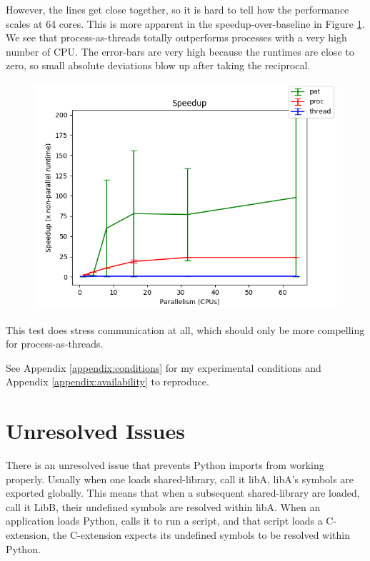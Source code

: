 \documentclass[letterpaper,twocolumn,10pt]{article}
\begin{document}
However, the lines get close together, so it is hard to tell how the performance scales at 64 cores.
This is more apparent in the speedup-over-baseline in Figure \ref{fig:count_speedup}.
We see that process-as-threads totally outperforms processes with a very high number of CPU.
The error-bars are very high because the runtimes are close to zero, so small absolute deviations blow up after taking the reciprocal.

\begin{figure}
\begin{center}
\includegraphics[width=\textwidth / 2]{total_speedup.png}
\end{center}
\caption{\label{fig:count_speedup} }
\end{figure}

This test does stress communication at all, which should only be more compelling for process-as-threads.

See Appendix \ref{appendix:conditions} for my experimental conditions and Appendix \ref{appendix:availability} to reproduce.

\section{Unresolved Issues}

There is an unresolved issue that prevents Python imports from working properly.
Usually when one loads shared-library, call it libA, libA's symbols are exported globally.
This means that when a subsequent shared-library are loaded, call it LibB, their undefined symbols are resolved within libA.
When an application loads Python, calls it to run a script, and that script loads a C-extension, the C-extension expects its undefined symbols to be resolved within Python.
\end{document}
